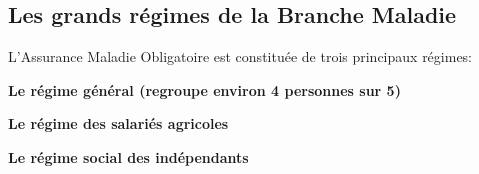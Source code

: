     \subsection{Les grands régimes de la Branche Maladie}
    
    L’Assurance Maladie Obligatoire est constituée de trois principaux régimes:
    \begin{itemize}[font=\normalsize]
                \textbf{ Le
régime général (regroupe environ 4 personnes sur 5) }\\
\end{itemize}
\begin{itemize}[font=\normalsize]
                \textbf{ Le
régime des salariés agricoles }\\
\end{itemize}
\begin{itemize}[font=\normalsize]
                \textbf{ Le
régime social des indépendants }\\
\end{itemize}
    
    
    
               \begin{figure}[H]
                \centering
                \end{figure}
    
        
